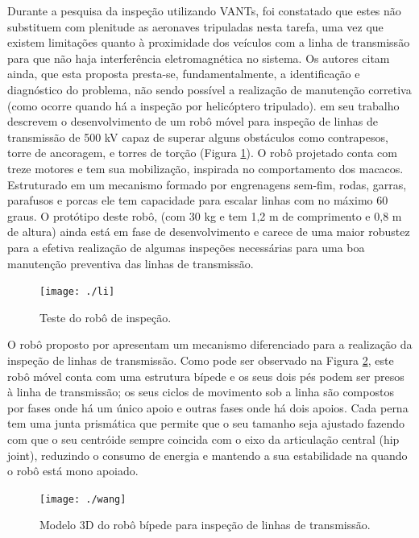 Durante a pesquisa da inspeção utilizando VANTs, foi constatado que estes não substituem com plenitude as aeronaves tripuladas nesta tarefa, uma vez que existem limitações quanto à proximidade dos veículos com a linha de transmissão para que não haja interferência eletromagnética no sistema. Os autores citam ainda, que esta proposta presta-se, fundamentalmente, a identificação e diagnóstico do problema, não sendo possível a realização de manutenção corretiva (como ocorre quando há a inspeção por helicóptero tripulado).  
 em seu trabalho descrevem o desenvolvimento de um robô móvel para inspeção de linhas de transmissão de 500 kV capaz de superar alguns obstáculos como contrapesos, torre de ancoragem, e torres de torção (Figura \ref{img:li}). O robô projetado conta com treze motores e tem sua mobilização, inspirada no comportamento dos macacos. Estruturado em um mecanismo formado por engrenagens sem-fim, rodas, garras, parafusos e porcas ele tem capacidade para escalar linhas com no máximo 60 graus. O protótipo deste robô, (com 30 kg e tem 1,2 m de comprimento e 0,8 m de altura) ainda está em fase de desenvolvimento e carece de uma maior robustez para a efetiva realização de algumas inspeções necessárias para uma boa manutenção preventiva das linhas de transmissão.

\begin{figure} [h!]	
	\caption{Teste do robô de inspeção.}
	\label{img:li}											 
	\centering													 
	\texttt{[image: ./li]}
\end{figure}													 

O robô proposto por  apresentam um mecanismo diferenciado para a realização da inspeção de linhas de transmissão. Como pode ser observado na Figura \ref{img:wang}, este robô móvel conta com uma estrutura bípede e os seus dois pés podem ser presos à linha de transmissão; os seus ciclos de movimento sob a linha são compostos por fases onde há um único apoio e outras fases onde há dois apoios. Cada perna tem uma junta prismática que permite que o seu tamanho seja ajustado fazendo com que o seu centróide sempre coincida com o eixo da articulação central (hip joint), reduzindo o consumo de energia e mantendo a sua estabilidade na quando o robô está mono apoiado. 

\begin{figure} [h!]	
	\caption{Modelo 3D do robô bípede para inspeção de linhas de transmissão.}
	\label{img:wang}											 
	\centering													 
	\texttt{[image: ./wang]}
\end{figure}													 

